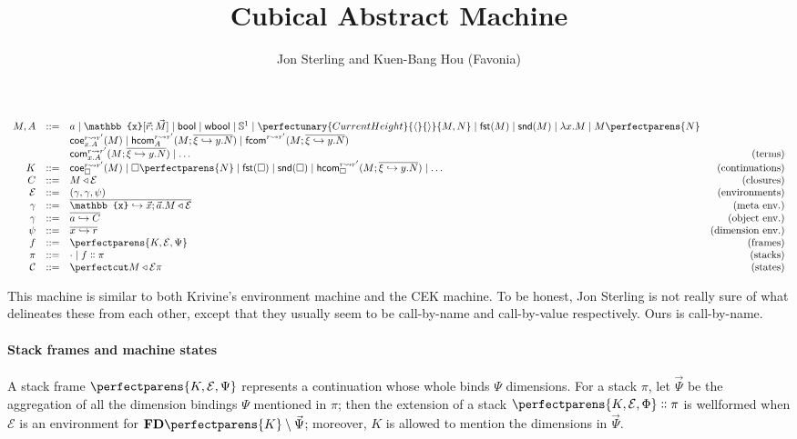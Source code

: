 \documentclass{article}
\title{Cubical Abstract Machine}
\author{Jon Sterling and Kuen-Bang Hou (Favonia)}
\newcommand\Clo[2]{#1\triangleleft{#2}}
\newcommand\Coe[4]{\mathsf{coe}^{#1\leadsto{#2}}_{#3} (#4)}
\newcommand\Com[5]{\mathsf{com}^{#1\leadsto{#2}}_{#3} (#4;#5)}
\newcommand\HCom[5]{\mathsf{hcom}^{#1\leadsto{#2}}_{#3} (#4;#5)}
\newcommand\FCom[4]{\mathsf{fcom}^{#1\leadsto{#2}} (#3;#4)}
\newcommand\Lam[2]{\lambda{#1}.{#2}}
\newcommand\Fst[1]{\mathsf{fst} (#1)}
\newcommand\Snd[1]{\mathsf{snd} (#1)}
\newcommand\Circ{\mathbb{S}^1}
\newcommand\Cons[2]{{#1}\dblcolon{#2}}
\newcommand\FreeDims[1]{\mathbf{FD}\perfectparens{#1}}
\newcommand\Bool{\mathsf{bool}}
\newcommand\WBool{\mathsf{wbool}}
\newcommand\Frame[3]{\perfectparens{#1,#2,#3}}
\newcommand\Cfg[3]{\cut{\Clo{#1}{#2}}{#3}}
\newcommand\App[2]{{#1}\perfectparens{#2}}
\newcommand\Pair[2]{\perfectunary{CurrentHeight}{\langle}{\rangle}{#1,#2}}
\newcommand\Meta[1]{\mathbb{#1}}
\begin{document}
\maketitle

\[
  \begin{array}{rrlr}
    M,A &::= &a\mid \Meta{x}[\vec{r};\vec{M}] \mid \Bool \mid \WBool \mid \Circ \mid \Pair{M}{N}\mid\Fst{M}\mid\Snd{M}\mid\Lam{x}{M}\mid\App{M}{N}
    \\
    &&\Coe{r}{r'}{x.A}{M}\mid\HCom{r}{r'}{A}{M}{\overline{\xi\hookrightarrow{}y.N}}\mid\FCom{r}{r'}{M}{\overline{\xi\hookrightarrow{}y.N}}\\
    &&\Com{r}{r'}{x.A}{M}{\overline{\xi\hookrightarrow{}y.N}}\mid\ldots&\text{(terms)}\\
    K &::= &\Coe{r}{r'}{\Box}{M}\mid\App{\Box}{N}\mid\Fst{\Box}\mid\Snd{\Box}\mid\HCom{r}{r'}{\Box}{M}{\overline{\xi\hookrightarrow{}y.N}}\mid\ldots&\text{(continuations)}\\
    C &::= &\Clo{M}{\mathcal{E}}&\text{(closures)}\\
    \mathcal{E} &::= &(\Meta{\gamma},\gamma,\psi)&\text{(environments)}\\
    \Meta{\gamma} &::= &\overline{\Meta{x}\hookrightarrow \vec{x};\vec{a}.\Clo{M}{\mathcal{E}}}&\text{(meta env.)}\\
    \gamma &::= &\overline{a\hookrightarrow C}&\text{(object env.)}\\
    \psi &::= &\overline{x\hookrightarrow r}&\text{(dimension env.)}\\
    f &::= &\Frame{K}{\mathcal{E}}{\Psi} &\text{(frames)}\\
    \pi &::= &\cdot \mid \Cons{f}{\pi} &\text{(stacks)}\\
    \mathcal{C} &::= &\Cfg{M}{\mathcal{E}}{\pi} &\text{(states)}
  \end{array}
\]

This machine is similar to both Krivine's environment machine and the
CEK machine. To be honest, Jon Sterling is not really sure of what
delineates these from each other, except that they usually seem to be
call-by-name and call-by-value respectively. Ours is call-by-name.

\paragraph{Stack frames and machine states}

A stack frame $\Frame{K}{\mathcal{E}}{\Psi}$ represents a continuation
whose whole binds $\Psi$ dimensions. For a stack $\pi$, let
$\vec{\Psi}$ be the aggregation of all the dimension bindings $\Psi$
mentioned in $\pi$; then the extension of a stack
$\Cons{\Frame{K}{\mathcal{E}}{\Phi}}{\pi}$ is wellformed when
$\mathcal{E}$ is an environment for $\FreeDims{K}\setminus\vec{\Psi}$;
moreover, $K$ is allowed to mention the dimensions in $\vec{\Psi}$.
\end{document}
